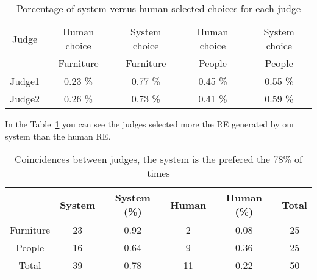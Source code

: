 \begin{table}[h!]
\begin{center}
\begin{tabular}{|c|c|c|c|c|}
\hline
Judge    & Human choice & System choice  & Human choice & System choice \\
	 &    Furniture &    Furniture   &    People    &    People \\
\hline 
Judge1   & 0.23 \%       & 0.77 \%     & 0.45 \% & 0.55 \% \\
Judge2   & 0.26 \%       & 0.73 \%     & 0.41 \% & 0.59 \% \\
\hline
\end{tabular}
\caption{Porcentage of system versus human selected choices for each judge} 
\label{system-versus-human}
\end{center}
\end{table}

In the Table~\ref{system-versus-human} you can see the judges selected more the RE generated by our system than the human RE.



\begin{table}[h!]
\begin{center}
\begin{tabular}{|c|c|c|c|c|c|}
\hline
           & System & System (\%) & Human & Human (\%) & Total\\
\hline
Furniture & 23  & 0.92 &  2 & 0.08  & 25 \\
People    & 16  & 0.64 & 9  & 0.36 & 25 \\
Total     & 39  & 0.78    & 11 & 0.22 & 50  \\
\hline
\end{tabular}
\caption{Coincidences between judges, the system is the prefered the 78\% of times} 
\label{system-better}
\end{center}
\end{table}

